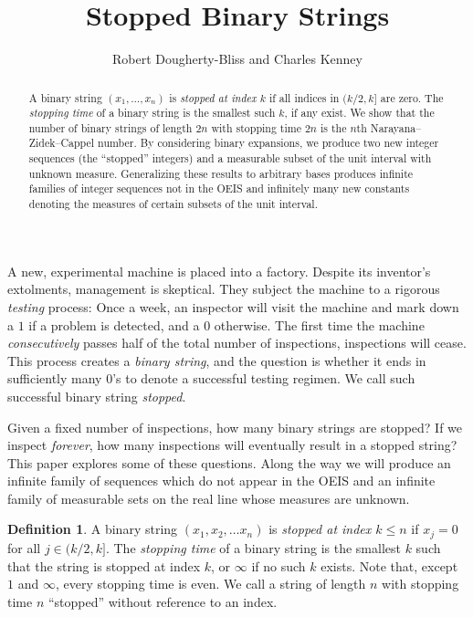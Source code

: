 \documentclass[12pt]{amsart}
\title{Stopped Binary Strings}
\author{Robert Dougherty-Bliss and Charles Kenney}
\theoremstyle{definition}
\newtheorem{definition}{Definition}
\begin{document}
\maketitle

\begin{abstract}
    A binary string $(x_1, \dots, x_n)$ is \emph{stopped at index $k$} if all
    indices in $(k / 2, k]$ are zero. The \emph{stopping time} of a binary
    string is the smallest such $k$, if any exist. We show that the number of
    binary strings of length $2n$ with stopping time $2n$ is the $n$th
    Narayana--Zidek--Cappel number. By considering binary expansions, we
    produce two new integer sequences (the ``stopped'' integers) and a
    measurable subset of the unit interval with unknown measure. Generalizing
    these results to arbitrary bases produces infinite families of integer
    sequences not in the OEIS and infinitely many new constants denoting the
    measures of certain subsets of the unit interval.
\end{abstract}

\noindent A new, experimental machine is placed into a factory. Despite its
inventor's extolments, management is skeptical. They subject the machine to a
rigorous \emph{testing} process: Once a week, an inspector will visit the
machine and mark down a $1$ if a problem is detected, and a $0$ otherwise. The
first time the machine \emph{consecutively} passes half of the total number of
inspections, inspections will cease. This process creates a \emph{binary
string}, and the question is whether it ends in sufficiently many $0$'s to
denote a successful testing regimen. We call such successful binary string
\emph{stopped}.

Given a fixed number of inspections, how many binary strings are stopped? If we
inspect \emph{forever}, how many inspections will eventually result in a
stopped string? This paper explores some of these questions. Along the way we
will produce an infinite family of sequences which do not appear in the OEIS
and an infinite family of measurable sets on the real line whose measures are
unknown.

\begin{definition}
    A binary string $(x_1, x_2, \dots x_n)$ is \emph{stopped at index $k \leq
    n$} if $x_j = 0$ for all $j \in (k / 2, k]$. The \emph{stopping time} of a
    binary string is the smallest $k$ such that the string is stopped at index
    $k$, or $\infty$ if no such $k$ exists. Note that, except $1$ and $\infty$,
    every stopping time is even. We call a string of length $n$ with stopping
    time $n$ ``stopped'' without reference to an index.
\end{definition}
\end{document}
